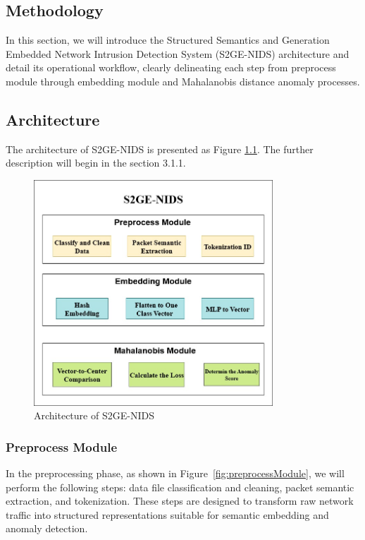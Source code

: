 \begin{ZhChapter}

    \chapter{Methodology}
    In this section, we will introduce the Structured Semantics and Generation Embedded Network Intrusion Detection System (S2GE-NIDS) architecture and detail its operational workflow, clearly delineating each step from preprocess module through embedding module and Mahalanobis distance anomaly processes.
    \section{Architecture} %
    The architecture of S2GE-NIDS is presented as Figure \ref{fig:Architecture}. The further description will begin in the section 3.1.1.

    \begin{figure}[htbp]
        \centering
        \includegraphics[width = 0.8\textwidth]{image/architecture.png}
        \caption{Architecture of S2GE-NIDS}
        \label{fig:Architecture}
    \end{figure}



    \subsection{Preprocess Module}
    In the preprocessing phase, as shown in Figure~\ref{fig:preprocessModule}, we will perform the following steps: data file classification and cleaning, packet semantic extraction, and tokenization. These steps are designed to transform raw network traffic into structured representations suitable for semantic embedding and anomaly detection.



\end{ZhChapter}
